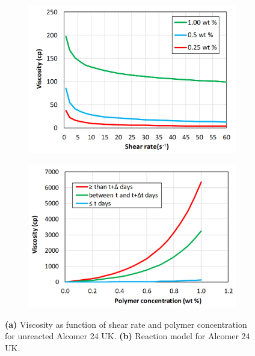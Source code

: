 \documentclass[energies,article,submit,moreauthors,pdftex]{Definitions/mdpi}
\begin{document}
\begin{figure}[h!]
    \centering
    \begin{subfigure}[b]{.49\textwidth}
        \includegraphics[width=\textwidth]{fig/viscAlcomer.png}
        \caption{}
        \label{cht:viscAlco}
    \end{subfigure}
    \begin{subfigure}[b]{.49\textwidth}
        \includegraphics[width=\textwidth]{fig/viscPolcModel.png}
        \caption{}
        \label{cht:viscPolcModel}
    \end{subfigure}
    \caption{\textbf{(a)} Viscosity as function of shear rate and polymer concentration for unreacted Alcomer 24 UK. \textbf{(b)} Reaction model for Alcomer 24 UK.}
\end{figure}
\end{document}
